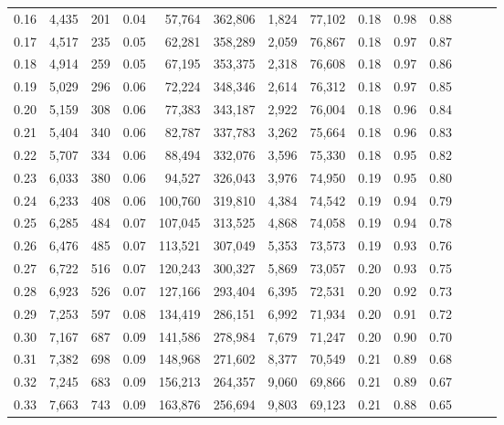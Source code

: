 \begin{tabular}{rrrrrrrrrrrrrr}
0.16 &   4,435 &    201 &  0.04 &   57,764 &  362,806 &   1,824 &  77,102 &  0.18 &  0.98 &      0.88 \\
0.17 &   4,517 &    235 &  0.05 &   62,281 &  358,289 &   2,059 &  76,867 &  0.18 &  0.97 &      0.87 \\
0.18 &   4,914 &    259 &  0.05 &   67,195 &  353,375 &   2,318 &  76,608 &  0.18 &  0.97 &      0.86 \\
0.19 &   5,029 &    296 &  0.06 &   72,224 &  348,346 &   2,614 &  76,312 &  0.18 &  0.97 &      0.85 \\
0.20 &   5,159 &    308 &  0.06 &   77,383 &  343,187 &   2,922 &  76,004 &  0.18 &  0.96 &      0.84 \\
0.21 &   5,404 &    340 &  0.06 &   82,787 &  337,783 &   3,262 &  75,664 &  0.18 &  0.96 &      0.83 \\
0.22 &   5,707 &    334 &  0.06 &   88,494 &  332,076 &   3,596 &  75,330 &  0.18 &  0.95 &      0.82 \\
0.23 &   6,033 &    380 &  0.06 &   94,527 &  326,043 &   3,976 &  74,950 &  0.19 &  0.95 &      0.80 \\
0.24 &   6,233 &    408 &  0.06 &  100,760 &  319,810 &   4,384 &  74,542 &  0.19 &  0.94 &      0.79 \\
0.25 &   6,285 &    484 &  0.07 &  107,045 &  313,525 &   4,868 &  74,058 &  0.19 &  0.94 &      0.78 \\
0.26 &   6,476 &    485 &  0.07 &  113,521 &  307,049 &   5,353 &  73,573 &  0.19 &  0.93 &      0.76 \\
0.27 &   6,722 &    516 &  0.07 &  120,243 &  300,327 &   5,869 &  73,057 &  0.20 &  0.93 &      0.75 \\
0.28 &   6,923 &    526 &  0.07 &  127,166 &  293,404 &   6,395 &  72,531 &  0.20 &  0.92 &      0.73 \\
0.29 &   7,253 &    597 &  0.08 &  134,419 &  286,151 &   6,992 &  71,934 &  0.20 &  0.91 &      0.72 \\
0.30 &   7,167 &    687 &  0.09 &  141,586 &  278,984 &   7,679 &  71,247 &  0.20 &  0.90 &      0.70 \\
0.31 &   7,382 &    698 &  0.09 &  148,968 &  271,602 &   8,377 &  70,549 &  0.21 &  0.89 &      0.68 \\
0.32 &   7,245 &    683 &  0.09 &  156,213 &  264,357 &   9,060 &  69,866 &  0.21 &  0.89 &      0.67 \\
0.33 &   7,663 &    743 &  0.09 &  163,876 &  256,694 &   9,803 &  69,123 &  0.21 &  0.88 &      0.65 \\

\end{tabular}
